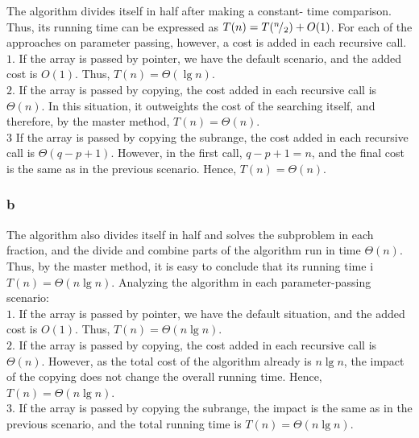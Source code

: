 \documentclass[8pt,a4paper]{article}
\begin{document}
  The  algorithm divides itself in half after making a constant-
time comparison. Thus, its running time can be expressed as $T(n) = T({}^{n}\!/_{2}) + O(1)$.
For each of the approaches on parameter passing, however, a cost is added in each recursive
call. \\

$1$. If the array is passed by pointer, we have the default scenario, and the added cost
is $O(1)$. Thus, $T(n) = \Theta(\lg n)$. \\

$2$. If the array is passed by copying, the cost added in each recursive call is $\Theta(n)$.
In this situation, it outweights the cost of the searching itself, and therefore,
by the master method, $T(n) = \Theta(n)$. \\

$3$ If the array is passed by copying the subrange, the cost added in each recursive call
is $\Theta(q - p +1)$. However, in the first call, $q -p + 1 = n$, and the final cost
is the same as in the previous scenario. Hence, $T(n) = \Theta(n)$.

\subsubsection*{b}

  The  algorithm also divides itself in half and solves the subproblem
in each fraction, and the divide and combine parts of the algorithm run in time $\Theta(n)$.
Thus, by the master method, it is easy to conclude that its running time i $T(n) = \Theta(n \lg n)$.
Analyzing the algorithm in each parameter-passing scenario: \\

$1$. If the array is passed by pointer, we have the default situation, and the added cost
is $O(1)$. Thus, $T(n) = \Theta(n \lg n)$. \\

$2$. If the array is passed by copying, the cost added in each recursive call is $\Theta(n)$.
However, as the total cost of the algorithm already is $n \lg n$, the impact of the copying
does not change the overall running time. Hence, $T(n) = \Theta(n \lg n)$. \\

$3$. If the array is passed by copying the subrange, the impact is the same as in the previous
scenario, and the total running time is $T(n) = \Theta(n \lg n)$. \\
\end{document}
